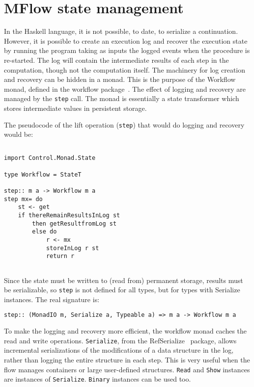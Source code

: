 \documentclass{tmr}
\begin{document}
 
\section{ MFlow state management} 
 
In the Haskell language, it is not possible, to date, to serialize a continuation.  However, it is possible to create an execution log and recover the execution state by running the program taking as inputs the logged events when the procedure is re-started. The log will contain the intermediate results of each step in the computation, though not the computation itself. The machinery for log creation and recovery can be hidden in a monad. This is the purpose of the Workflow monad, defined in the workflow package~\cite{auth:workflow}. The effect of logging and recovery are managed by the {\tt step} call. The monad is essentially a state transformer which stores intermediate values in persistent storage. 
 
The pseudocode of the lift operation ({\tt step}) that would do 
logging and recovery would be: 
 
{\tt 
 
\begin{verbatim} 
 
import Control.Monad.State 
 
type Workflow = StateT 
 
step:: m a -> Workflow m a 
step mx= do 
    st <- get 
    if thereRemainResultsInLog st 
        then getResultfromLog st 
        else do 
            r <- mx 
            storeInLog r st 
            return r 
 
\end{verbatim} 
 
} 
 
Since the  state must be written to (read from) permanent storage, results must be serializable, so {\tt step} is not defined for all types, but for types with Serialize instances. The real signature is: 
 
{\tt 
 
\begin{verbatim} 
step:: (MonadIO m, Serialize a, Typeable a) => m a -> Workflow m a 
\end{verbatim} 
 
} 
 
 
To make the logging and recovery more efficient, the workflow monad caches the read and write operations.  {\tt Serialize}, from the RefSerialize~\cite{auth:refserialize} package, allows incremental serializations of the modifications of a data structure in the log, rather than logging the entire structure in each step. This is very useful when the flow manages containers or large user-defined structures. {\tt Read} and {\tt Show} instances are instances of {\tt Serialize}. {\tt Binary} instances can be used too. 
 
\end{document}
